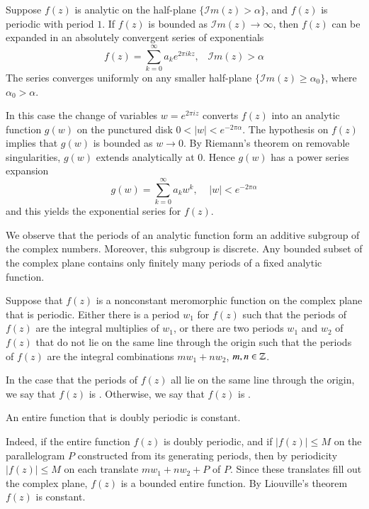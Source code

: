 \begin{theorem}
    Suppose $f(z)$ is analytic on the half-plane $\{\mathscr{I}m(z) > \alpha\}$, and $f(z)$ is periodic with period $1$. If $f(z)$ is bounded as $\mathscr{I}m(z)\rightarrow \infty$, then $f(z)$ can be expanded in an absolutely convergent series of exponentials \begin{equation*}
        f(z) = \sum_{k=0}^{\infty}a_ke^{2\pi ikz},\;\;\;\mathscr{I}m(z) > \alpha
    \end{equation*}
    The series converges uniformly on any smaller half-plane $\{\mathscr{I}m(z) \geq \alpha_0\}$, where $\alpha_0 > \alpha$.
\end{theorem}
In this case the change of variables $w = e^{2\pi iz}$ converts $f(z)$ into an analytic function $g(w)$ on the punctured disk $0 < |w| < e^{-2\pi \alpha}$. The hypothesis on $f(z)$ implies that $g(w)$ is bounded as $w\rightarrow 0$. By Riemann's theorem on removable singularities, $g(w)$ extends analytically at $0$. Hence $g(w)$ has a power series expansion \begin{equation*}
    g(w) = \sum_{k=0}^{\infty}a_kw^k,\;\;\;\;|w| < e^{-2\pi \alpha}
\end{equation*}
and this yields the exponential series for $f(z)$. 

We observe that the periods of an analytic function form an additive subgroup of the complex numbers. Moreover, this subgroup is discrete. Any bounded subset of the complex plane contains only finitely many periods of a fixed analytic function.

\begin{theorem}
    Suppose that $f(z)$ is a nonconstant meromorphic function on the complex plane that is periodic. Either there is a period $w_1$ for $f(z)$ such that the periods of $f(z)$ are the integral multiplies of $w_1$, or there are two periods $w_1$ and $w_2$ of $f(z)$ that do not lie on the same line through the origin such that the periods of $f(z)$ are the integral combinations $mw_1+nw_2$, $m,n \in \mathbb Z$.
\end{theorem}

In the case that the periods of $f(z)$ all lie on the same line through the origin, we say that $f(z)$ is . Otherwise, we say that $f(z)$ is .

\begin{theorem}
    An entire function that is doubly periodic is constant.
\end{theorem}
Indeed, if the entire function $f(z)$ is doubly periodic, and if $|f(z)| \leq M$ on the parallelogram $P$ constructed from its generating periods, then by periodicity $|f(z)| \leq M$ on each translate $mw_1+nw_2 + P$ of $P$. Since these translates fill out the complex plane, $f(z)$ is a bounded entire function. By Liouville's theorem $f(z)$ is constant.




